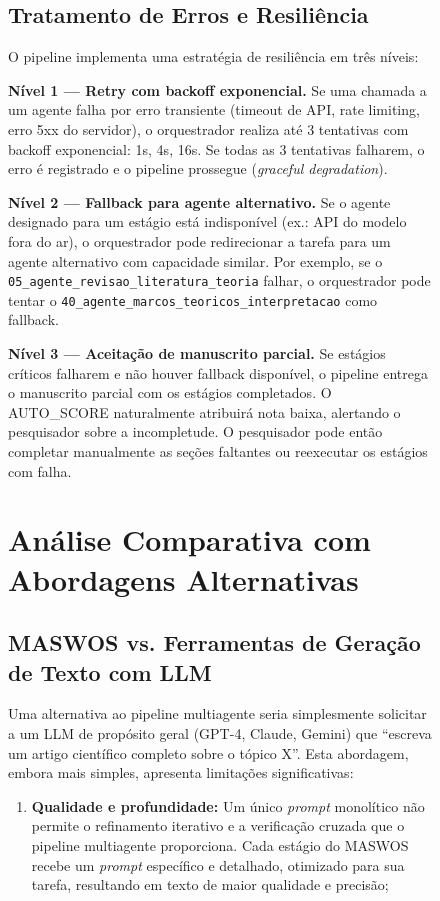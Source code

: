 \begin{figure}
\subsection{Tratamento de Erros e Resiliência}
\label{sec:resiliencia}

O pipeline implementa uma estratégia de resiliência em três níveis:

\textbf{Nível 1 — Retry com backoff exponencial.} Se uma chamada
a um agente falha por erro transiente (timeout de API, rate
limiting, erro 5xx do servidor), o orquestrador realiza até 3
tentativas com backoff exponencial: 1s, 4s, 16s. Se todas as 3
tentativas falharem, o erro é registrado e o pipeline prossegue
(\textit{graceful degradation}).

\textbf{Nível 2 — Fallback para agente alternativo.} Se o agente
designado para um estágio está indisponível (ex.: API do modelo
fora do ar), o orquestrador pode redirecionar a tarefa para um
agente alternativo com capacidade similar. Por exemplo, se o
\texttt{05\_agente\_revisao\_literatura\_teoria} falhar, o
orquestrador pode tentar o
\texttt{40\_agente\_marcos\_teoricos\_interpretacao} como fallback.

\textbf{Nível 3 — Aceitação de manuscrito parcial.} Se estágios
críticos falharem e não houver fallback disponível, o pipeline
entrega o manuscrito parcial com os estágios completados. O
AUTO\_SCORE naturalmente atribuirá nota baixa, alertando o
pesquisador sobre a incompletude. O pesquisador pode então
completar manualmente as seções faltantes ou reexecutar os
estágios com falha.

\section{Análise Comparativa com Abordagens Alternativas}
\label{sec:analise_comparativa}

\subsection{MASWOS vs. Ferramentas de Geração de Texto com LLM}
\label{sec:vs_llm}

Uma alternativa ao pipeline multiagente seria simplesmente
solicitar a um LLM de propósito geral (GPT-4, Claude, Gemini) que
``escreva um artigo científico completo sobre o tópico X''. Esta
abordagem, embora mais simples, apresenta limitações
significativas:

\begin{enumerate}
    \item \textbf{Qualidade e profundidade:} Um único \textit{prompt}
    monolítico não permite o refinamento iterativo e a verificação
    cruzada que o pipeline multiagente proporciona. Cada estágio do
    MASWOS recebe um \textit{prompt} específico e detalhado,
    otimizado para sua tarefa, resultando em texto de maior
    qualidade e precisão;


\end{enumerate}
\end{figure}
